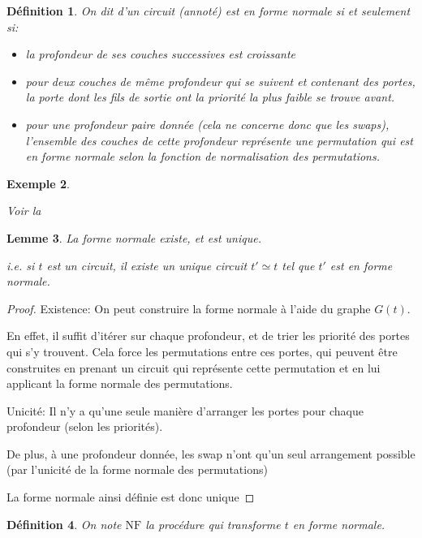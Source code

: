 \documentclass[12pt, a4paper]{article}
\newtheorem{definition}{Définition}[subsection]
\newtheorem{lemma}[definition]{Lemme}
\newtheorem{example}[definition]{Exemple}
\def\nf{ \mathrm{NF} }
\begin{document}
\begin{definition}
    On dit d'un circuit (annoté) est en forme normale si et seulement si:
    \begin{itemize}
        \item la profondeur de ses couches successives est croissante
        \item pour deux couches de même profondeur qui se suivent et contenant des portes, la porte dont les fils de sortie ont la priorité la plus faible se trouve avant.
        \item pour une profondeur paire donnée (cela ne concerne donc que les swaps), l'ensemble des couches de cette profondeur représente une permutation qui est en forme normale selon la fonction de normalisation des permutations.
    \end{itemize}
\end{definition}

\begin{example}
    \label{ex:nf}

    Voir la \hyperref[ann:nf]{}
\end{example}

\begin{lemma}
    La forme normale existe, et est unique.
    
    i.e. si $t$ est un circuit, il existe un unique circuit $t' \simeq t$ tel que $t'$ est en forme normale.
\end{lemma}
\begin{proof}
    Existence: On peut construire la forme normale à l'aide du graphe $G(t)$.

    En effet, il suffit d'itérer sur chaque profondeur, et de trier les priorité des portes qui s'y trouvent. Cela force les permutations entre ces portes, qui peuvent être construites en prenant un circuit qui représente cette permutation et en lui applicant la forme normale des permutations.

    Unicité: Il n'y a qu'une seule manière d'arranger les portes pour chaque profondeur (selon les priorités).

    De plus, à une profondeur donnée, les swap n'ont qu'un seul arrangement possible (par l'unicité de la forme normale des permutations)

    La forme normale ainsi définie est donc unique
\end{proof}

\begin{definition}
    On note $\nf$ la procédure qui transforme $t$ en forme normale.
\end{definition}
\end{document}
